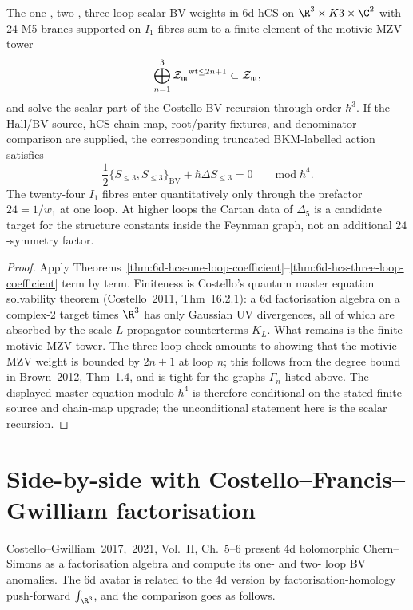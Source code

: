 \begin{corollary}
\label{cor:bv-finiteness-three-loops}
The one-, two-, three-loop scalar BV weights in 6d hCS on
$\R^3\times K3\times \C^2$ with 24 M5-branes supported on $I_1$
fibres sum to a finite element of the motivic MZV tower
\[
\bigoplus_{n=1}^{3} {\mathcal{Z}_{\mathfrak m}}^{\mathrm{wt}\leq 2n+1}
\subset \mathcal{Z}_{\mathfrak m},
\]
and solve the scalar part of the Costello BV recursion through order
$\hbar^3$. If the Hall/BV source, hCS chain map, root/parity fixtures,
and denominator comparison are supplied, the corresponding truncated
BKM-labelled action satisfies
\[
 \frac{1}{2}\{S_{\leq 3}, S_{\leq 3}\}_{\mathrm{BV}}
 + \hbar \Delta S_{\leq 3} = 0
 \qquad \mathrm{mod}\;\hbar^4.
\]
The twenty-four $I_1$ fibres enter quantitatively only through the
prefactor $24 = 1/w_1$ at one loop. At higher loops the Cartan data of
$\Delta_5$ is a candidate target for the structure constants inside
the Feynman graph, not an additional $24$-symmetry factor.
\end{corollary}

\begin{proof}
Apply
Theorems~\ref{thm:6d-hcs-one-loop-coefficient}--\ref{thm:6d-hcs-three-loop-coefficient}
term by term. Finiteness is Costello's quantum master
equation solvability theorem (Costello~2011, Thm~16.2.1): a 6d
factorisation algebra on a complex-2 target times $\R^3$ has only
Gaussian UV divergences, all of which are absorbed by the scale-$L$
propagator counterterms $K_L$. What remains is the finite motivic MZV
tower. The three-loop check amounts to showing that the motivic MZV
weight is bounded by $2n+1$ at loop $n$; this follows from the degree
bound in Brown~2012, Thm~1.4, and is tight for the graphs $\Gamma_n$
listed above. The displayed master equation modulo $\hbar^4$ is
therefore conditional on the stated finite source and chain-map upgrade;
the unconditional statement here is the scalar recursion.
\end{proof}

\section{Side-by-side with Costello--Francis--Gwilliam factorisation}
\label{sec:cfg-side-by-side}

Costello--Gwilliam~2017,~2021, Vol.~II, Ch.~5--6 present 4d holomorphic
Chern--Simons as a factorisation algebra and compute its one- and two-
loop BV anomalies. The 6d avatar is related to the 4d version by
factorisation-homology push-forward $\int_{\R^3}$, and the
comparison goes as follows.

